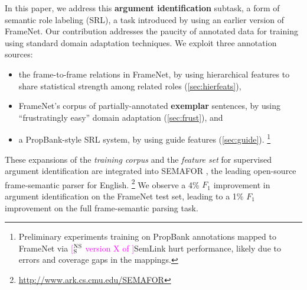 \documentclass[11pt,a4paper]{article}
\newcommand{\ensuretext}[1]{#1}
\newcommand{\nssmarker}{\ensuretext{\textcolor{magenta}{\ensuremath{^{\textsc{NS}}_{\textsc{S}}}}}}
\newcommand{\nasmarker}{\ensuretext{\textcolor{blue}{\ensuremath{^{\textsc{NA}}_{\textsc{S}}}}}}
\newcommand{\arkcomment}[3]{\ensuretext{\textcolor{#3}{[#1 #2]}}}
\newcommand{\nss}[1]{\arkcomment{\nssmarker}{#1}{magenta}}
\newcommand{\nascomment}[1]{\arkcomment{\nasmarker}{#1}{blue}}
\newcommand{\finalversion}[1]{#1}
\begin{document}
In this paper, we address this \textbf{argument identification} 
subtask, a form of semantic role labeling (SRL), 
a task introduced by \citet{gildea-02} using an earlier version of FrameNet.
Our contribution addresses the paucity of annotated data for training 
using  standard domain
adaptation techniques.  We exploit three annotation sources:

\begin{itemize}
  \item the frame-to-frame relations in FrameNet, by using
  hierarchical features to share statistical strength among related roles
  (\cref{sec:hierfeats}),
  \item FrameNet's corpus of partially-annotated \textbf{exemplar} sentences,
  by using ``frustratingly easy'' domain adaptation (\cref{sec:frust}), and
  \item a PropBank-style SRL system, by using guide features (\cref{sec:guide}).%
\footnote{Preliminary experiments training on PropBank annotations mapped to 
FrameNet via \finalversion{\nss{version X of }}SemLink \citep{bonial-13} hurt performance, likely due to errors and coverage gaps in the mappings.}
\end{itemize}
These expansions of the \emph{training corpus} and the \emph{feature set}
for supervised argument identification  are integrated into SEMAFOR
\citep{das-14},  the leading open-source frame-semantic parser for English.
\footnote{\url{http://www.ark.cs.cmu.edu/SEMAFOR}}
We observe a 4\% $F_1$ improvement in argument identification on the
FrameNet test set, leading to a 1\% $F_1$ improvement on the full
frame-semantic parsing task. 
\end{document}
